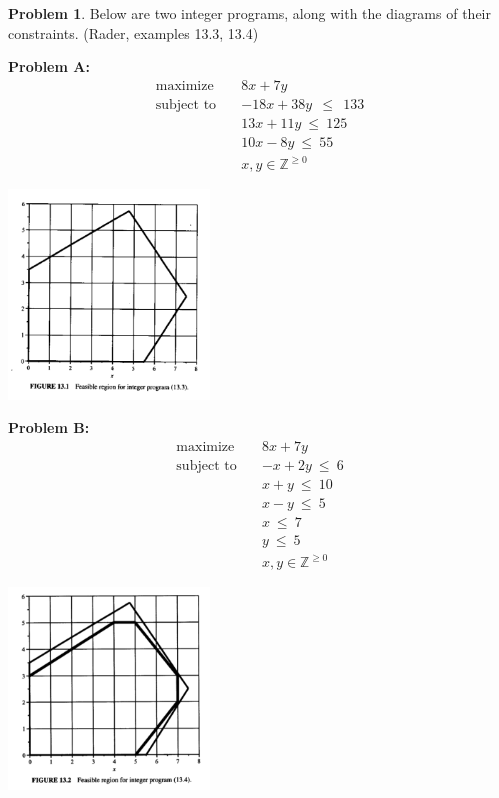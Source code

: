 \documentclass[11pt]{article}
\theoremstyle{definition}
\newtheorem{problem}{Problem}
\newcommand{\maximize}{\text{maximize}}
\newcommand{\subjectto}{\text{subject to}}
\begin{document}
\newpage
\begin{problem}  
Below are two integer programs, along with the diagrams of their constraints. (Rader, examples 13.3, 13.4) 

\begin{multicols}{2}

{\bf Problem A:}
\begin{align*}
      \maximize \quad & 8x + 7y \\
      \subjectto \quad & -18x + 38y ~~\leq~~ 133\\
                       & 13x + 11y ~\leq~ 125\\
                       & 10x - 8y ~\leq~ 55\\
                       & x,y \in \mathbb{Z}^{\geq 0}
\end{align*}
\vspace{6cm}

\includegraphics[width = 0.4\textwidth]{formulation_bad}
\end{multicols}

\begin{multicols}{2}

{\bf Problem B:}
\begin{align*}
      \maximize \quad & 8x + 7y \\
      \subjectto \quad & -x+2y ~\leq~ 6\\
                       & x + y ~\leq~ 10\\
                       & x - y ~\leq~ 5\\
                       & x ~\leq~ 7\\
                       & y ~\leq~ 5\\
                       & x,y \in \mathbb{Z}^{\geq 0}
\end{align*}
\vspace{6cm}

\includegraphics[width = 0.4\textwidth]{formulation_ideal}
\end{multicols}



\end{problem}
\end{document}

